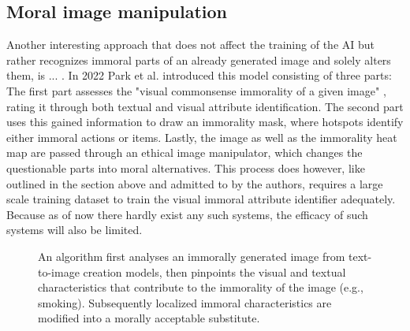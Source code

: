 \documentclass[10pt,twocolumn,twoside]{osajnl}
\begin{document}
\subsection{Moral image manipulation}
Another interesting approach that does not affect the training of the AI but rather recognizes immoral parts of an already generated image and solely alters them, is ... . 
In 2022 Park et al. introduced this model consisting of three parts: 
The first part assesses the "visual commonsense immorality of a given image" \cite{MoralEditing}, rating it through both textual and visual attribute identification. 
The second part uses this gained information to draw an immorality mask, where hotspots identify either immoral actions or items. 
Lastly, the image as well as the immorality heat map are passed through an ethical image manipulator, which changes the questionable parts into moral alternatives. 
This process does however, like outlined in the section above and admitted to by the authors, requires a large scale training dataset to train the visual immoral attribute identifier adequately. 
Because as of now there hardly exist any such systems, the efficacy of such systems will also be limited.
\cite{MoralEditing} 

\begin{figure}[htbp]
		\centering
		\caption{An algorithm first analyses an immorally generated image from text-to-image creation models, then pinpoints the visual and textual characteristics that contribute to the immorality of the image (e.g., smoking). Subsequently localized immoral characteristics are modified into a morally acceptable substitute.\cite{MoralEditing}}
\end{figure}
\end{document}

